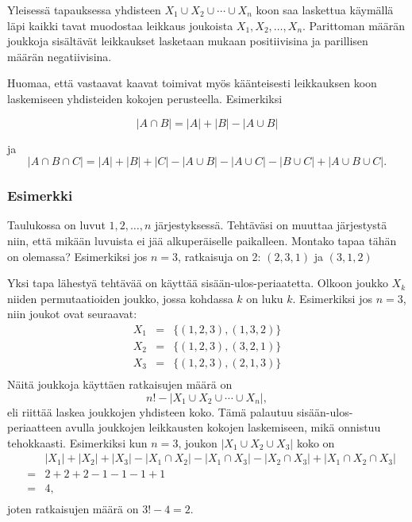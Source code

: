 Yleisessä tapauksessa yhdisteen $X_1 \cup X_2 \cup \cdots \cup X_n$
koon saa laskettua käymällä läpi kaikki tavat muodostaa
leikkaus joukoista $X_1,X_2,\ldots,X_n$.
Parittoman määrän joukkoja sisältävät leikkaukset
lasketaan mukaan positiivisina ja
parillisen määrän negatiivisina.

Huomaa, että vastaavat kaavat toimivat myös käänteisesti
leikkauksen koon laskemiseen yhdisteiden kokojen perusteella.
Esimerkiksi

\[ |A \cap B| = |A| + |B| - |A \cup B|\]

ja
\[ |A \cap B \cap C| = |A| + |B| + |C| - |A \cup B|  - |A \cup C|  - |B \cup C| + |A \cup B \cup C| .\]

\subsubsection*{Esimerkki}

\begin{task}
Taulukossa on luvut $1,2,\ldots,n$ järjestyksessä.
Tehtäväsi on muuttaa järjestystä niin,
että mikään luvuista ei jää alkuperäiselle paikalleen.
Montako tapaa tähän on olemassa?
Esimerkiksi jos $n=3$, ratkaisuja on 2: $(2,3,1)$ ja $(3,1,2)$
\end{task}

Yksi tapa lähestyä tehtävää on käyttää sisään-ulos-periaatetta.
Olkoon joukko $X_k$ niiden permutaatioiden joukko,
jossa kohdassa $k$ on luku $k$.
Esimerkiksi jos $n=3$, niin joukot ovat seuraavat:
\[
\begin{array}{lcl}
X_1 & = & \{(1,2,3),(1,3,2)\} \\
X_2 & = & \{(1,2,3),(3,2,1)\} \\
X_3 & = & \{(1,2,3),(2,1,3)\} \\
\end{array}
\]
Näitä joukkoja käyttäen ratkaisujen määrä on
\[ n! - |X_1 \cup X_2 \cup \cdots \cup X_n|, \]
eli
riittää laskea joukkojen yhdisteen koko.
Tämä palautuu sisään-ulos-peri\-aatteen avulla
joukkojen leikkausten kokojen laskemiseen,
mikä onnistuu tehokkaasti.
Esimerkiksi kun $n=3$, joukon $|X_1 \cup X_2 \cup X_3|$ koko on
\[
\begin{array}{lcl}
 & & |X_1| + |X_2| + |X_3| - |X_1 \cap X_2|  - |X_1 \cap X_3|  - |X_2 \cap X_3| + |X_1 \cap X_2 \cap X_3| \\
 & = & 2+2+2-1-1-1+1 \\
 & = & 4, \\
\end{array}
\]
joten ratkaisujen määrä on $3!-4=2$.

